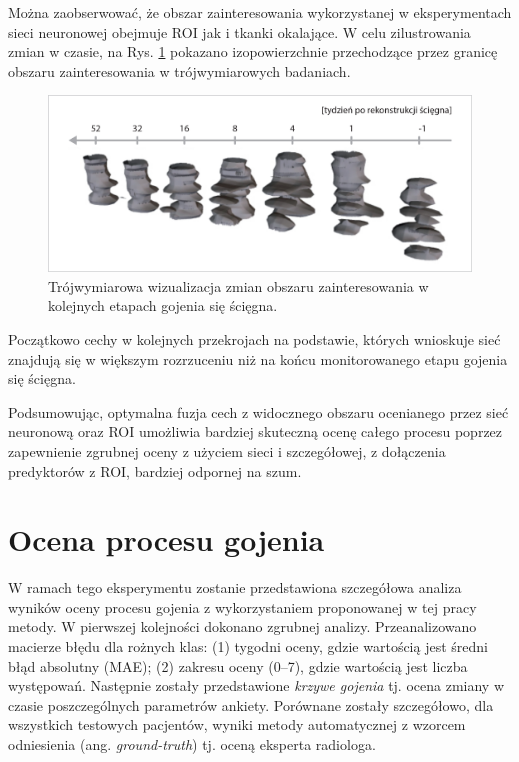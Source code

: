 Można zaobserwować, że obszar zainteresowania wykorzystanej w eksperymentach sieci neuronowej obejmuje ROI jak i tkanki okalające. W celu zilustrowania zmian w czasie, na Rys. \ref{fig:3DXAI} pokazano izopowierzchnie przechodzące przez granicę obszaru zainteresowania w trójwymiarowych badaniach.
\begin{figure}[h!]
	\centering
	\includegraphics[width=1\textwidth]{figures/3DXAI.jpg}
	\caption{Trójwymiarowa wizualizacja zmian obszaru zainteresowania w kolejnych etapach gojenia się ścięgna.}\label{fig:3DXAI}
\end{figure}
Początkowo cechy w kolejnych przekrojach na podstawie, których wnioskuje sieć znajdują się w większym rozrzuceniu niż na końcu monitorowanego etapu gojenia się ścięgna.

Podsumowując, optymalna fuzja cech z widocznego obszaru ocenianego przez sieć neuronową oraz ROI umożliwia bardziej skuteczną ocenę całego procesu poprzez zapewnienie zgrubnej oceny z użyciem sieci i szczegółowej, z dołączenia predyktorów z ROI, bardziej odpornej na szum. 

\section{Ocena procesu gojenia}
\label{seq:valuation}
W ramach tego eksperymentu zostanie przedstawiona szczegółowa analiza wyników oceny procesu gojenia z wykorzystaniem proponowanej w tej pracy metody. \linebreak W pierwszej kolejności dokonano zgrubnej analizy. Przeanalizowano macierze błędu dla rożnych klas: (1) tygodni oceny, gdzie wartością jest średni błąd absolutny (MAE); (2) zakresu oceny (0--7), gdzie wartością jest liczba występowań. Następnie zostały przedstawione \textit{krzywe gojenia} tj. ocena zmiany w czasie poszczególnych parametrów ankiety. Porównane zostały szczegółowo, dla wszystkich testowych pacjentów, wyniki metody automatycznej z wzorcem odniesienia (ang. \textit{ground-truth}) tj. oceną eksperta radiologa.

